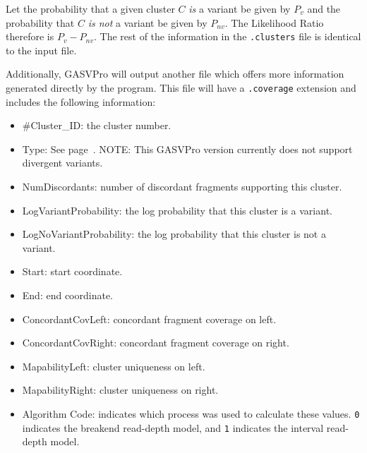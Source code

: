 \documentclass[11pt]{article}
\begin{document}
\noindent Let the probability that a given cluster $C$ {\em is} a variant be given by $P_v$ and the probability that $C$ {\em is not} a variant be given by $P_{nv}$.  The Likelihood Ratio therefore is $P_v - P_{nv}$. The rest of the information in the \verb+.clusters+ file is identical to the input file. \label{LRexp}

Additionally, GASVPro will output another file which offers more information generated directly by the program. This file will have a \verb+.coverage+ extension and includes the following information:
\begin{framed}
\begin{itemize}
	\item[] \#Cluster\_ID: {\small the cluster number.}
	\item[] Type: {\small See page~\pageref{structvartypes}}. {\scriptsize NOTE: This GASVPro version currently does not support divergent variants.}
	\item[] NumDiscordants: {\small number of discordant fragments supporting this cluster.}
	\item[] LogVariantProbability: {\small the log probability that this cluster is a variant.}
	\item[] LogNoVariantProbability: {\small the log probability that this cluster is not a variant.}
	\item[] Start: {\small start coordinate.}
	\item[] End: {\small end coordinate.}
	\item[] ConcordantCovLeft: {\small concordant fragment coverage on left.}
	\item[] ConcordantCovRight: {\small concordant fragment coverage on right.}
	\item[] MapabilityLeft: {\small cluster uniqueness on left.}
	\item[] MapabilityRight: {\small cluster uniqueness on right.}
	\item[] Algorithm Code: {\small indicates which process was used to calculate these values. \verb+0+ indicates the breakend read-depth model, and \verb+1+ indicates the interval read-depth model.}
	\end{itemize}
\end{framed}
\end{document}

